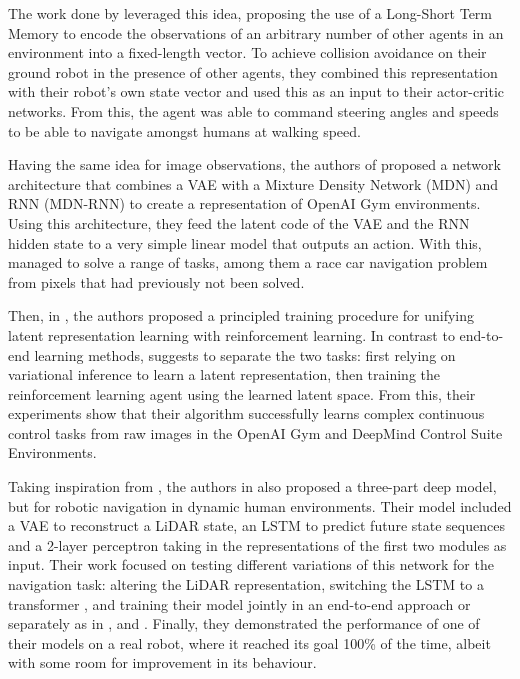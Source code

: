 The work done by \cite{MotionPlanningAmongDynamicAgentsDRL2018} leveraged this idea, proposing the use of a Long-Short Term Memory to encode the observations of an arbitrary number of other agents in an environment into a fixed-length vector. To achieve collision avoidance on their ground robot in the presence of other agents, they combined this representation with their robot's own state vector and used this as an input to their actor-critic networks. From this, the agent was able to command steering angles and speeds to be able to navigate amongst humans at walking speed.

Having the same idea for image observations, the authors of \cite{worldModels2018} proposed a network architecture that combines a VAE with a Mixture Density Network (MDN) and RNN (MDN-RNN) to create a representation of OpenAI Gym \cite{openAIgym} environments. Using this architecture, they feed the latent code of the VAE and the RNN hidden state to a very simple linear model that outputs an action. With this, \cite{worldModels2018} managed to solve a range of tasks, among them a race car navigation problem from pixels that had previously not been solved.

Then, in \cite{stochastic_latent_actor_critic}, the authors proposed a principled training procedure for unifying latent representation learning with reinforcement learning. In contrast to end-to-end learning methods, \cite{stochastic_latent_actor_critic} suggests to separate the two tasks: first relying on variational inference to learn a latent representation, then training the reinforcement learning agent using the learned latent space. From this, their experiments show that their algorithm successfully learns complex continuous control tasks from raw images in the OpenAI Gym and DeepMind Control Suite Environments.

Taking inspiration from \cite{worldModels2018}, the authors in \cite{NavRep_unsupervised} also proposed a three-part deep model, but for robotic navigation in dynamic human environments. Their model included a VAE to reconstruct a LiDAR state, an LSTM to predict future state sequences and a 2-layer perceptron taking in the representations of the first two modules as input. Their work focused on testing different variations of this network for the navigation task: altering the LiDAR representation, switching the LSTM to a transformer \cite{transformer}, and training their model jointly in an end-to-end approach or separately as in \cite{worldModels2018}, and \cite{stochastic_latent_actor_critic}. Finally, they demonstrated the performance of one of their models on a real robot, where it reached its goal 100\% of the time, albeit with some room for improvement in its behaviour.

